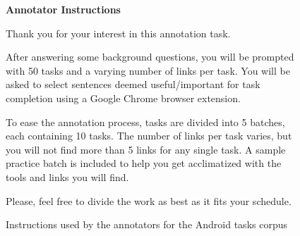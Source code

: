 

\begin{figure}[!htb]
\begin{mdframed}[backgroundcolor=gray!05] 
\begin{scriptsize}

{\large \textbf{Annotator Instructions}} \bigskip


Thank you for your interest in this annotation task. \bigskip
 
After answering some background questions, you will be prompted with 50 tasks and a varying number of links per task. You will be asked to select sentences deemed useful/important for task completion using a Google Chrome browser extension. \bigskip


To ease the annotation process,  tasks are divided into 5 batches, each containing 10 tasks. The number of links per task varies, but you will not find more than 5 links for any single task. A sample practice batch is included to help you get acclimatized with the tools and links you will find. \bigskip


Please, feel free to divide the work as best as it fits your schedule.


\end{scriptsize}
\end{mdframed}
\caption{Instructions used by the annotators for the Android tasks corpus}
\end{figure}

\vfill
